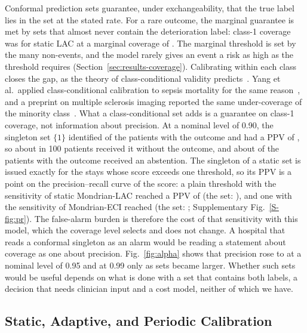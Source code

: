 Conformal prediction sets guarantee, under exchangeability, that the true label lies in the set at the stated rate. For a rare outcome, the marginal guarantee is met by
sets that almost never contain the deterioration label: class-1 coverage was \RVSetCovOneStaticLac{} for static LAC at a marginal coverage of \RVSetCovStaticLac{}. The
marginal threshold is set by the many non-events, and the model rarely gives an event a risk as high as the threshold requires (Section~\ref{sec:results-coverage}).
Calibrating within each class closes the gap, as the theory of class-conditional validity predicts~\cite{vovk2003mondrian,ding2023classconditional}.
Yang et al.\ applied class-conditional calibration to sepsis mortality for the same reason~\cite{yang2024sepsisconformal}, and a preprint on multiple sclerosis imaging
reported the same under-coverage of the minority class~\cite{millar2026classconditionalms}. What a class-conditional set adds is a guarantee on class-1 coverage, not information about precision. At a nominal level of 0.90, the singleton
set $\{1\}$ identified \RVSetSensMondEci{} of the patients with the outcome and had a PPV of \RVSetPpvMondEci{}, so about \RVSetFaMondEci{} in 100 patients received it
without the outcome, and about \RVSetAbstOneMondEci{} of the patients with the outcome received an abstention. The singleton of a static set is issued exactly for the stays whose score exceeds one threshold, so its PPV is a point on the precision--recall curve of the score: a plain threshold with the sensitivity of static Mondrian-LAC reached a PPV of \RVPrMondSame{} (the set: \RVPrMondPpv{}), and one with the sensitivity of Mondrian-ECI reached \RVPrEciSame{} (the set: \RVPrEciPpv{}; Supplementary Fig.~\ref{S-fig:pr}). The false-alarm burden is therefore the cost of that sensitivity with this model, which the coverage level selects and does not change. A hospital that reads a conformal singleton as an alarm would be reading a statement about coverage as one about precision. Fig.~\ref{fig:alpha} shows that precision rose to \RVAFivePpvMondEci{} at a nominal level of 0.95 and \RVAOnePpvMondEci{} at 0.99 only as sets became larger. Whether
such sets would be useful depends on what is done with a set that contains both labels, a decision that needs clinician input and a cost model, neither of which we
have.

\subsection{Static, Adaptive, and Periodic Calibration}

